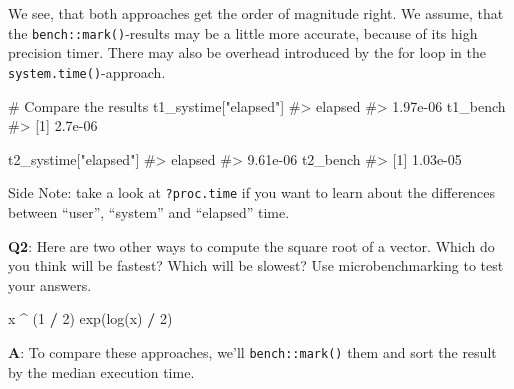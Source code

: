 \documentclass[
]{krantz}
\makeatletter
\newenvironment{Shaded}{\begin{snugshade}}{\end{snugshade}}
\newcommand{\CommentTok}[1]{\textcolor[rgb]{0.56,0.35,0.01}{\textit{#1}}}
\newcommand{\DecValTok}[1]{\textcolor[rgb]{0.00,0.00,0.81}{#1}}
\newcommand{\KeywordTok}[1]{\textcolor[rgb]{0.13,0.29,0.53}{\textbf{#1}}}
\newcommand{\NormalTok}[1]{#1}
\newcommand{\OperatorTok}[1]{\textcolor[rgb]{0.81,0.36,0.00}{\textbf{#1}}}
\newcommand{\StringTok}[1]{\textcolor[rgb]{0.31,0.60,0.02}{#1}}
\newenvironment{kframe}{%
\medskip{}
\setlength{\fboxsep}{.8em}
 \def\at@end@of@kframe{}%
 \ifinner\ifhmode%
  \def\at@end@of@kframe{\end{minipage}}%
  \begin{minipage}{\columnwidth}%
 \fi\fi%
 \def\FrameCommand##1{\hskip\@totalleftmargin \hskip-\fboxsep
 \colorbox{shadecolor}{##1}\hskip-\fboxsep
     \hskip-\linewidth \hskip-\@totalleftmargin \hskip\columnwidth}%
 \MakeFramed {\advance\hsize-\width
   \@totalleftmargin\z@ \linewidth\hsize
   \@setminipage}}%
 {\par\unskip\endMakeFramed%
 \at@end@of@kframe}
\renewenvironment{Shaded}{\begin{kframe}}{\end{kframe}}
\renewcommand{\KeywordTok} [1]{\textcolor[rgb]{0.00,0.44,0.13}{{#1}}}
\renewcommand{\DecValTok}  [1]{\textcolor[rgb]{0.25,0.63,0.44}{{#1}}}
\renewcommand{\StringTok}  [1]{\textcolor[rgb]{0.25,0.44,0.63}{{#1}}}
\renewcommand{\CommentTok} [1]{\textcolor[rgb]{0.38,0.63,0.69}{{#1}}}
\renewcommand{\NormalTok}  [1]{{#1}}
\makeatother
\begin{document}
We see, that both approaches get the order of magnitude right. We assume, that the \texttt{bench::mark()}-results may be a little more accurate, because of its high precision timer. There may also be overhead introduced by the for loop in the \texttt{system.time()}-approach.

\begin{Shaded}
\begin{Highlighting}[]
\CommentTok{# Compare the results}
\NormalTok{t1_systime[}\StringTok{"elapsed"}\NormalTok{]}
\CommentTok{#>  elapsed }
\CommentTok{#> 1.97e-06}
\NormalTok{t1_bench}
\CommentTok{#> [1] 2.7e-06}

\NormalTok{t2_systime[}\StringTok{"elapsed"}\NormalTok{]}
\CommentTok{#>  elapsed }
\CommentTok{#> 9.61e-06}
\NormalTok{t2_bench}
\CommentTok{#> [1] 1.03e-05}
\end{Highlighting}
\end{Shaded}

Side Note: take a look at \texttt{?proc.time} if you want to learn about the differences between ``user'', ``system'' and ``elapsed'' time.

\textbf{{Q2}}: Here are two other ways to compute the square root of a vector. Which do you think will be fastest? Which will be slowest? Use microbenchmarking to test your answers.

\begin{Shaded}
\begin{Highlighting}[]
\NormalTok{x }\OperatorTok{^}\StringTok{ }\NormalTok{(}\DecValTok{1} \OperatorTok{/}\StringTok{ }\DecValTok{2}\NormalTok{)}
\KeywordTok{exp}\NormalTok{(}\KeywordTok{log}\NormalTok{(x) }\OperatorTok{/}\StringTok{ }\DecValTok{2}\NormalTok{)}
\end{Highlighting}
\end{Shaded}

\textbf{{A}}: To compare these approaches, we'll \texttt{bench::mark()} them and sort the result by the median execution time.
\end{document}
